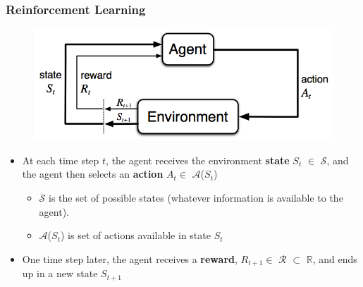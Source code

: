 \documentclass{beamer}
\begin{document}
\begin{frame}
\frametitle{Reinforcement Learning}

\begin{figure}[t]
\includegraphics[scale=0.3]{AgentEnvironment}
\centering
\end{figure}

\begin{itemize}
\item At each time step $t$, the agent receives the environment \textbf{state} $S_t$ $\in$ $\mathscr{S}$, 
 and the agent then selects an \textbf{action} $A_t \in$ $\mathscr{A}$($S_t$) 
   \begin{itemize}
   	\item $\mathscr{S}$ is the set of possible states (whatever information is available to the agent).
        \item $\mathscr{A}$($S_t$) is set of actions available in state $S_t$
      \end{itemize}
\item One time step later, the agent receives a \textbf{reward}, $R_{t+1} \in$ $\mathscr{R}$ $\subset$ $\mathbb{R}$,
and ends up in a new state $S_{t+1}$
\end{itemize}
\end{frame}

\end{document}
